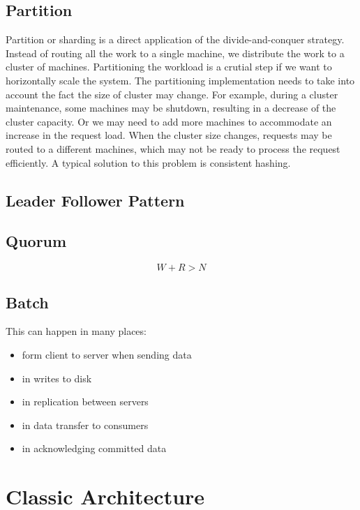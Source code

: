 \documentclass[letterpaper, oneside]{book}
\theoremstyle{definition}
\theoremstyle{remark}
\begin{document}
\section{Partition}
Partition or sharding is a direct application of the divide-and-conquer strategy. Instead of routing all the work to a single machine, we distribute the work to a cluster of machines. Partitioning the workload is a crutial step if we want to horizontally scale the system. The partitioning implementation needs to take into account the fact the size of cluster may change.
For example, during a cluster maintenance, some machines may be shutdown, resulting in a decrease of the cluster capacity. Or we may need to add more machines to accommodate an increase in the request load. When the cluster size changes, requests may be routed to a different machines, which may not be ready to process the request efficiently. A typical solution to this problem is consistent hashing.


\section{Leader Follower Pattern}

\section{Quorum}

\begin{displaymath}
    W + R > N
\end{displaymath}

\section{Batch}

This can happen in many places:
\begin{itemize}
    \item form client to server when sending data
    \item in writes to disk
    \item in replication between servers
    \item in data transfer to consumers
    \item in acknowledging committed data
\end{itemize}



\chapter{Classic Architecture}
\end{document}
